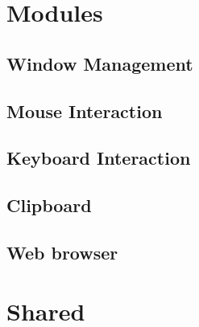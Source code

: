 \section{Modules}

\subsection{Window Management}
\subsection{Mouse Interaction}
\subsection{Keyboard Interaction}
\subsection{Clipboard}
\subsection{Web browser}

\section{Shared}
